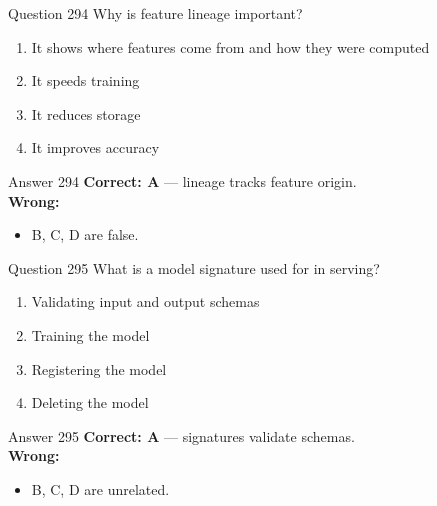 \documentclass[aspectratio=169,11pt]{beamer}
\begin{document}
	\begin{frame}{Question 294}
		Why is feature lineage important?
		\begin{enumerate}[label=\Alph*.]
			\item It shows where features come from and how they were computed
			\item It speeds training
			\item It reduces storage
			\item It improves accuracy
		\end{enumerate}
	\end{frame}
	\begin{frame}{Answer 294}
		\textbf{Correct: A} --- lineage tracks feature origin.\\
		\vspace{0.5em}
		\textbf{Wrong:}
		\begin{itemize}
			\item B, C, D are false.
		\end{itemize}
	\end{frame}
	
	\begin{frame}{Question 295}
		What is a model signature used for in serving?
		\begin{enumerate}[label=\Alph*.]
			\item Validating input and output schemas
			\item Training the model
			\item Registering the model
			\item Deleting the model
		\end{enumerate}
	\end{frame}
	\begin{frame}{Answer 295}
		\textbf{Correct: A} --- signatures validate schemas.\\
		\vspace{0.5em}
		\textbf{Wrong:}
		\begin{itemize}
			\item B, C, D are unrelated.
		\end{itemize}
	\end{frame}
	
\end{document}

